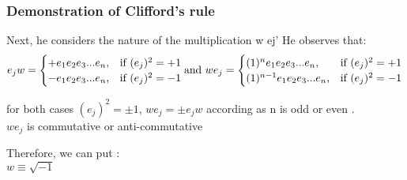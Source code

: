 \begin{frame}\frametitle{Demonstration of Clifford’s rule }

 Next, he considers the nature of the multiplication w ej' He observes that:\\
 
\[

   e_j w = 
\begin{cases}
+ e_1 e_2 e_3 ...e_n,& \text{if } (e_j)^2 = + 1\\
- e_1 e_2 e_3 ...e_n,              &  \text{if } (e_j)^2 = - 1
\end{cases}

\\ 
\text{and }
\\
    w e_j= 
\begin{cases}
(1)^n e_1 e_2 e_3 ...e_n,& \text{if } (e_j)^2 = + 1\\
(1)^{n-1} e_1 e_2 e_3 ...e_n,              &  \text{if } (e_j)^2 = - 1
\end{cases}

\]
 
for both cases $(e_j)^2 = \pm 1$, $w e_j = \pm e_j w$ according as n is odd or even .\\
 
 
 $w e_j $ is commutative or anti-commutative 
 

Therefore, we can put :\\

$w \equiv \sqrt{-1}$ 
\end{frame}


